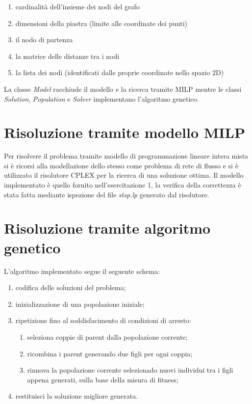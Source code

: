 \documentclass[a4paper]{article}
\begin{document}
        \begin{enumerate}
            \item cardinalit\`a dell'insieme dei nodi del grafo
            \item dimensioni della piastra (limite alle coordinate dei punti)
            \item il nodo di partenza
            \item la matrice delle distanze tra i nodi
            \item la lista dei nodi (identificati dalle proprie coordinate nello spazio 2D)
        \end{enumerate}

        La classe \emph{Model} racchiude il modello e la ricerca tramite MILP mentre le classi \emph{Solution}, \emph{Population} e \emph{Solver}
        implementano l'algoritmo genetico.
        
    \section{Risoluzione tramite modello MILP}
        Per risolvere il problema tramite modello di programmazione lineare intera mista si \`e ricorsi alla modellazione dello stesso come problema di
        rete di flusso e si \`e utilizzato il risolutore CPLEX per la ricerca di una soluzione ottima.
        Il modello implementato \`e quello fornito nell'esercitazione 1, la verifica della correttezza \`e stata fatta mediante ispezione del file
        \emph{stsp.lp} generato dal risolutore.

    \section{Risoluzione tramite algoritmo genetico}
        L'algoritmo implementato segue il seguente schema:
        \begin{enumerate}
            \item codifica delle soluzioni del problema;
            \item inizializzazione di una popolazione iniziale;
            \item ripetizione fino al soddisfacimento di condizioni di arresto:
                \begin{enumerate}
                    \item seleziona coppie di parent dalla popolazione corrente;
                    \item ricombina i parent generando due figli per ogni coppia;
                    \item rinnova la popolazione corrente selezionado nuovi individui
                        tra i figli appena generati, sulla base della misura di fitness;
                \end{enumerate}
            \item restituisci la soluzione migliore generata.
        \end{enumerate}
\end{document}
